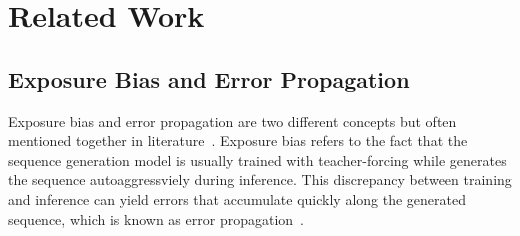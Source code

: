 \documentclass[11pt,a4paper]{article}
\begin{document}
\begin{comment}
The series of analyses in this paper can facilitate the comprehensive and deep understanding of the error propagation problem in sequence generation.  We summarize our findings and highlights as follows. First, through empirical analyses we found that the influence of error propagation is overstated by the literature, which may misguide the following researchers. Second, error propagation alone cannot fully explain the accuracy mismatch between the left and right part words. Third, we found the branching in language well correlate to this accuracy mismatch between left and right part of sentence and the corresponding analysis on n-gram statistics and dependency parsing well explain this phenomena.

This paper is organized as follows. We first introduce the related works in Section 2. Then we conduct the analyses on error propagation and characteristics of language which contribute to the accuracy mismatch in Section 3 and 4. More extended analyses and discussions are listed in Section 5. Section 6 concludes this paper.
\end{comment}


\section{Related Work}
\label{related_work}

\subsection{Exposure Bias and Error Propagation}
Exposure bias and error propagation are two different concepts but often mentioned together in literature~\cite{DBLP:conf/nips/BengioVJS15,DBLP:conf/acl/ShenCHHWSL16,DBLP:journals/corr/RanzatoCAZ15,DBLP:conf/naacl/LiuUFS16,DBLP:conf/aaai/LiuFUS16,DBLP:journals/corr/abs-1801-05122,DBLP:journals/corr/abs-1803-05567}. Exposure bias refers to the fact that the sequence generation model is usually trained with teacher-forcing while generates the sequence autoaggressviely during inference. This discrepancy between training and inference can yield errors that accumulate quickly along the generated sequence, which is known as error propagation~\cite{DBLP:conf/nips/BengioVJS15,DBLP:conf/acl/ShenCHHWSL16,DBLP:journals/corr/RanzatoCAZ15}.
\end{document}
